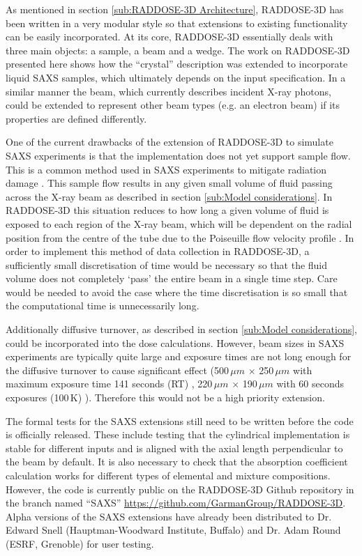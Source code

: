 As mentioned in section \ref{sub:RADDOSE-3D Architecture}, RADDOSE-3D has been written in a very modular style so that extensions to existing functionality can be easily incorporated.
At its core, RADDOSE-3D essentially deals with three main objects: a sample, a beam and a wedge.
The work on RADDOSE-3D presented here shows how the ``crystal'' description was extended to incorporate liquid SAXS samples, which ultimately depends on the input specification.
In a similar manner the beam, which currently describes incident X-ray photons, could be extended to represent other beam types (e.g. an electron beam) if its properties are defined differently.

One of the current drawbacks of the extension of RADDOSE-3D to simulate SAXS experiments is that the implementation does not yet support sample flow.
This is a common method used in SAXS experiments to mitigate radiation damage \cite{jeffries2015limiting}.
This sample flow results in any given small volume of fluid passing across the X-ray beam as described in section \ref{sub:Model considerations}.
In RADDOSE-3D this situation reduces to how long a given volume of fluid is exposed to each region of the X-ray beam, which will be dependent on the radial position from the centre of the tube due to the Poiseuille flow velocity profile \cite{hopkins2016quantifying}.
In order to implement this method of data collection in RADDOSE-3D, a sufficiently small discretisation of time would be necessary so that the fluid volume does not completely `pass' the entire beam in a single time step.
Care would be needed to avoid the case where the time discretisation is so small that the computational time is unnecessarily long.

Additionally diffusive turnover, as described in section \ref{sub:Model considerations}, could be incorporated into the dose calculations.
However, beam sizes in SAXS experiments are typically quite large and exposure times are not long enough for the diffusive turnover to cause significant effect (500$\,\mu m$ $\times$ 250$\,\mu m$ with maximum exposure time 141 seconds (RT) \cite{jeffries2015limiting}, 220$\,\mu m$ $\times$ 190$\,\mu m$ with 60 seconds exposures (100$\,$K) \cite{meisburger2013breaking}).
Therefore this would not be a high priority extension.

The formal tests for the SAXS extensions still need to be written before the code is officially released.
These include testing that the cylindrical implementation is stable for different inputs and is aligned with the axial length perpendicular to the beam by default.
It is also necessary to check that the absorption coefficient calculation works for different types of elemental and mixture compositions.
However, the code is currently public on the RADDOSE-3D Github repository in the branch named ``SAXS'' \url{https://github.com/GarmanGroup/RADDOSE-3D}.
Alpha versions of the SAXS extensions have already been distributed to Dr. Edward Snell (Hauptman-Woodward Institute, Buffalo) and Dr. Adam Round (ESRF, Grenoble) for user testing.

